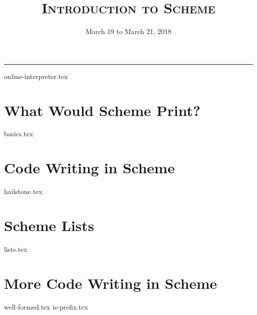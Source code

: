 \documentclass{exam}
\title{\textsc{Introduction to Scheme}}
\date{March 19 to March 21, 2018}
\begin{document}
\maketitle
\rule{\textwidth}{0.15em}
\fontsize{12}{15}\selectfont

{online-interpreter.tex}
\begin{questions}
\section{What Would Scheme Print?}
{basics.tex}

\section{Code Writing in Scheme}
{hailstone.tex}

\section{Scheme Lists}
{lists.tex}

\section{More Code Writing in Scheme}
{well-formed.tex}
{is-prefix.tex}

\end{questions}
\end{document}
